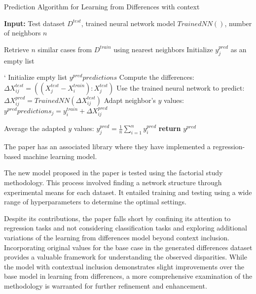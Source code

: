 \documentclass[a4paper, 12pt]{report}
\begin{document}
\begin{algorithm}
	\caption{Prediction Algorithm for Learning from Differences with context}
	\label{alg:learning_from_differences_varient_predict_alg4}

	\textbf{Input:} Test dataset $D^{test}$, trained neural network model $Trained NN()$, number of neighbors $n$
	\begin{algorithmic}[h]
			\State Retrieve $n$ similar cases from $D^{train}$ using nearest neighbors
			\State Initialize $y^{pred}_j$ as an empty list

			`	\State Initialize empty list $y^{pred}predictions$
				\State Compute the differences: $\Delta X^{test}_{ij} = ((X^{test}_j - X^{train}_i):X^{test}_j)$
				\State Use the trained neural network to predict: ${\Delta X^{pred}_{ij}} = Trained NN(\Delta X^{test}_{ij})$
				\State Adapt neighbor's $y$ values: $y^{pred}predictions_j = y^{train}_i + \Delta X^{pred}_{ij}$
			\EndFor
			
			\State Average the adapted $y$ values: $y^{pred}_j = \frac{1}{n} \sum_{i=1}^{n} y^{pred}_i$
            \State \textbf{return} $y^{pred}$
		\EndFor

	\end{algorithmic}
\end{algorithm}

The paper \cite{learningFromDifferences2022} has an associated library where they have implemented a regression-based machine learning model.

The new model proposed in the paper is tested using the factorial study methodology.
This process involved finding a network structure through experimental means for each dataset.
It entailed training and testing using a wide range of hyperparameters to determine the optimal settings.

Despite its contributions, the paper falls short by confining its attention to regression tasks and not considering classification tasks and exploring additional
variations of the learning from differences model beyond context inclusion.
Incorporating original values for the base case in the generated differences dataset provides a valuable framework for understanding the observed disparities.
While the model with contextual inclusion demonstrates slight improvements over the base model in learning from differences, a more comprehensive examination of the methodology is warranted for
further refinement and enhancement.
\end{document}
